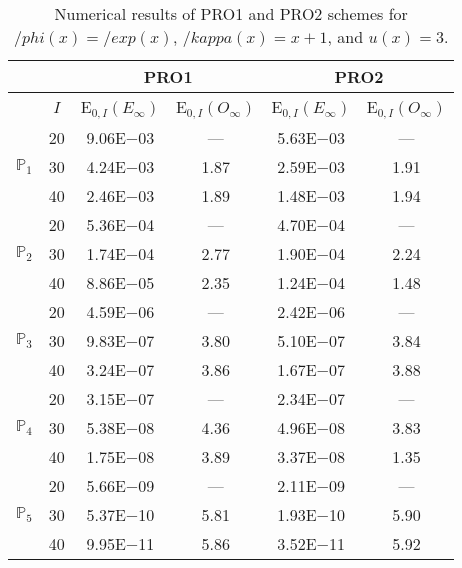 \begin{table}[H]
\caption{Numerical results of PRO1 and PRO2 schemes for $/phi(x)=/exp(x)$, $/kappa(x)=x+1$, and $u(x)=3$.}
\setlength{\tabcolsep}{5pt}
\centering
\begin{tabular}{@{}l c c c c c@{}}
\toprule
 &  & \multicolumn{2}{c}{PRO1} & \multicolumn{2}{c}{PRO2}\\
\midrule
 & $I$ & E$_{0,I}(E_{\infty})$ & E$_{0,I}(O_{\infty})$ & E$_{0,I}(E_{\infty})$ & E$_{0,I}(O_{\infty})$\\
\midrule
\multirow{3}{*}{$\mathbb{P}_{1}$}
 & 20 & 9.06E$-$03 & --- & 5.63E$-$03 & ---\\
 & 30 & 4.24E$-$03 & 1.87 & 2.59E$-$03 & 1.91 \\
 & 40 & 2.46E$-$03 & 1.89 & 1.48E$-$03 & 1.94 \\
\midrule
\multirow{3}{*}{$\mathbb{P}_{2}$}
 & 20 & 5.36E$-$04 & --- & 4.70E$-$04 & ---\\
 & 30 & 1.74E$-$04 & 2.77 & 1.90E$-$04 & 2.24 \\
 & 40 & 8.86E$-$05 & 2.35 & 1.24E$-$04 & 1.48 \\
\midrule
\multirow{3}{*}{$\mathbb{P}_{3}$}
 & 20 & 4.59E$-$06 & --- & 2.42E$-$06 & ---\\
 & 30 & 9.83E$-$07 & 3.80 & 5.10E$-$07 & 3.84 \\
 & 40 & 3.24E$-$07 & 3.86 & 1.67E$-$07 & 3.88 \\
\midrule
\multirow{3}{*}{$\mathbb{P}_{4}$}
 & 20 & 3.15E$-$07 & --- & 2.34E$-$07 & ---\\
 & 30 & 5.38E$-$08 & 4.36 & 4.96E$-$08 & 3.83 \\
 & 40 & 1.75E$-$08 & 3.89 & 3.37E$-$08 & 1.35 \\
\midrule
\multirow{3}{*}{$\mathbb{P}_{5}$}
 & 20 & 5.66E$-$09 & --- & 2.11E$-$09 & ---\\
 & 30 & 5.37E$-$10 & 5.81 & 1.93E$-$10 & 5.90 \\
 & 40 & 9.95E$-$11 & 5.86 & 3.52E$-$11 & 5.92 \\
\bottomrule
\end{tabular}
\label{Table:PRO:Test7}
\end{table}

